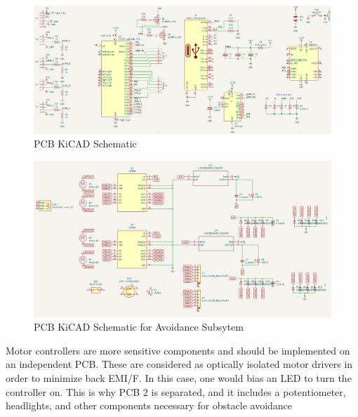 \begin{figure}[H]
	\centering
	\includegraphics[width=\textwidth]{./Images/PCB1-sch.png}
	\caption{\label{fig:pcb-sch}PCB KiCAD Schematic}
\end{figure}


\begin{figure}[H]
	\centering
	\includegraphics[width=\textwidth]{./Images/pcb-avoidance-headers.png}
	\caption{\label{fig:pcb-motor}PCB KiCAD Schematic for Avoidance Subsytem}
\end{figure}

\noindent Motor controllers are more sensitive components and should be implemented on an independent PCB. These are considered as optically isolated motor drivers in order to minimize back EMI/F. In this case, one would bias an LED to turn the controller on. This is why PCB 2 is separated, and it includes a potentiometer, headlights, and other components necessary for obstacle avoidance\\

